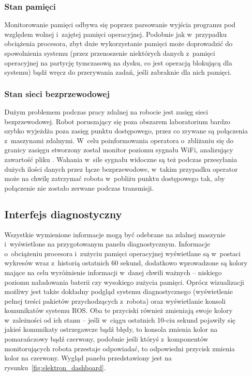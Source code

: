 \subsubsection{Stan pamięci}

Monitorowanie pamięci odbywa się poprzez parsowanie wyjścia programu 
pod względem wolnej i~zajętej pamięci operacyjnej. Podobnie jak w~przypadku
obciążenia procesora, zbyt duże wykorzystanie pamięci może doprowadzić do
spowolnienia systemu (przez przenoszenie niektórych danych z~pamięci
operacyjnej na partycję tymczasową na dysku, co jest operacją blokującą dla
systemu) bądź wręcz do przerywania zadań, jeśli zabraknie dla nich pamięci.


\subsubsection{Stan sieci bezprzewodowej}

Dużym problemem podczas pracy zdalnej na robocie jest zasięg sieci
bezprzewodowej. Robot poruszający się poza obszarem laboratorium bardzo szybko
wyjeżdża poza zasięg punktu dostępowego, przez co zrywane są połączenia
z~maszynami zdalnymi. W~celu poinformowania operatora o~zbliżaniu się do granicy
zasięgu stworzony został monitor poziomu sygnału WiFi, analizujący zawartość
pliku . Wahania w~sile sygnału widoczne są też podczas
przesyłania dużych ilości danych przez łącze bezprzewodowe, w~takim przypadku
operator może na chwilę zatrzymać robota w~pobliżu punktu dostępowego tak, aby
połączenie nie zostało zerwane podczas transmisji.

\subsection{Interfejs diagnostyczny}

Wszystkie wymienione informacje mogą być odebrane na zdalnej maszynie
i~wyświetlone na przygotowanym panelu diagnostycznym. Informacje o~obciążeniu
procesora i~zużyciu pamięci operacyjnej wyświetlane są w~postaci wykresów
wraz z~historią ostatnich 60 sekund, dodatkowo wprowadzone są kolory mające
na celu wyróżnienie informacji w~danej chwili ważnych -- niskiego poziomu
naładowania baterii czy wysokiego zużycia pamięci. Oprócz wizualizacji
możliwy jest także dokładny podgląd systemu diagnostycznego (wyświetlenie
pełnej treści pakietów przychodzących z~robota) oraz wyświetlanie konsoli
komunikatów systemu ROS. Oba te przyciski również zmieniają swoje kolory
w~zależności od ich stanu -- jeśli w~ciągu ostatnich 10-ciu sekund pojawiły
się jakieś komunikaty ostrzegawcze bądź błędy, to konsola zmienia kolor na
pomarańczowy bądź czerwony, podobnie jeśli któryś z~komponentów monitorujących
robota przestaje odpowiadać, to odpowiedni przycisk zmienia kolor na czerwony.
Wygląd panelu przedstawiony jest na rysunku~\ref{fig:elektron_dashboard}.

